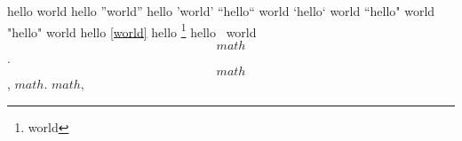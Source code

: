 
hello world              %
hello ''world''          %
hello 'world'            %
``hello`` world          %
`hello` world            %
``hello" world           %
"hello" world            %
hello \ref{world}        %
hello \footnote{world}   %
hello~ world             %
\[math\].                %
\[math\],                %
$math.$                  %
$math,$                  %

